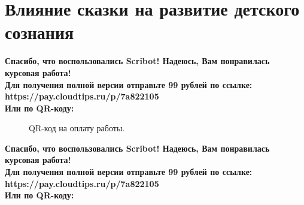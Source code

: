 \documentclass{article}
\begin{document}
\section{Влияние сказки на развитие детского сознания}
\begin{center}
    \textbf{
        Спасибо, что воспользовались Scribot! Надеюсь, Вам понравилась курсовая работа!\\
        Для получения полной версии отправьте 99 рублей по ссылке:\\
        https://pay.cloudtips.ru/p/7a822105\\
        Или по QR-коду:\\
    }
\end{center}
\begin{figure}[h]
    \caption{QR-код на оплату работы.}
    \label{ris:image}
\end{figure}
\newpage
\begin{center}
    \textbf{
        Спасибо, что воспользовались Scribot! Надеюсь, Вам понравилась курсовая работа!\\
        Для получения полной версии отправьте 99 рублей по ссылке:\\
        https://pay.cloudtips.ru/p/7a822105\\
        Или по QR-коду:\\
    }
\end{center}
\end{document}
